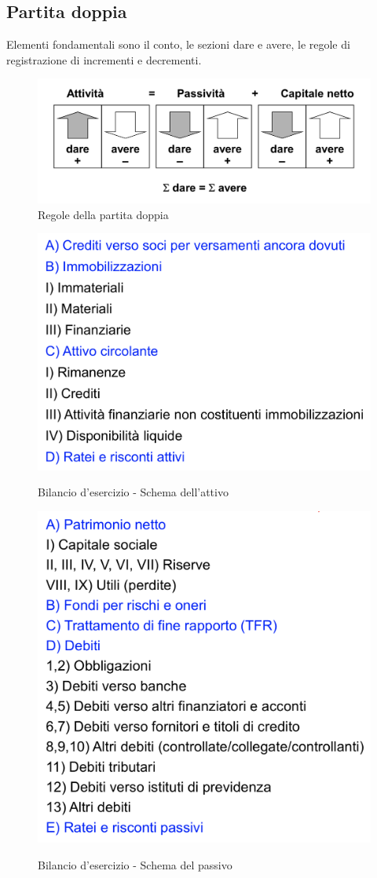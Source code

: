 \documentclass{report}
\begin{document}
	\subsection{Partita doppia}
	Elementi fondamentali sono il conto, le sezioni dare e avere, le regole di registrazione di incrementi e decrementi.
	\begin{figure}[h]
		\centering
		\includegraphics[width=0.7\linewidth]{images/partita-doppia}
		\caption{Regole della partita doppia}
		\label{fig:partita-doppia}
	\end{figure}
	\begin{figure}[H]
		\centering
		\caption{Bilancio d'esercizio - Schema dell'attivo}
		\includegraphics[width=0.7\linewidth]{images/schema-attivo}
		\label{fig:schema-attivo}
	\end{figure}
	\begin{figure}[H]
		\centering
		\caption{Bilancio d'esercizio - Schema del passivo}
		\includegraphics[width=0.7\linewidth]{images/schema-passivo}
		\label{fig:schema-passivo}
	\end{figure}
\end{document}
